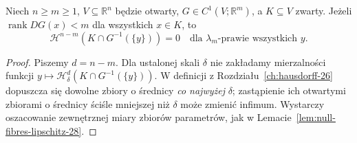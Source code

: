 \begin{lemat}
\label{lem:critical-coarea-null-28}
Niech $n\ge m\ge1$, $V\subseteq\mathbb R^n$
będzie otwarty, $G\in C^1(V;\mathbb R^m)$,
a $K\subseteq V$ zwarty. Jeżeli
$\operatorname{rank}DG(x)<m$ dla wszystkich $x\in K$,
to
\[
 \mathcal H^{n-m}(K\cap G^{-1}(\{y\}))=0
 \quad\text{dla }\lambda_m\text{-prawie wszystkich }y.
\]
\end{lemat}
\begin{proof}
Piszemy $d=n-m$. Dla ustalonej skali $\delta$ nie
zakładamy mierzalności funkcji
$y\mapsto\mathcal H^d_\delta(K\cap G^{-1}(\{y\}))$.
W definicji z Rozdziału~\ref{ch:hausdorff-26} dopuszcza
się dowolne zbiory o średnicy \emph{co najwyżej}
$\delta$; zastąpienie ich otwartymi zbiorami o średnicy
ściśle mniejszej niż $\delta$ może zmienić infimum.
Wystarczy oszacowanie zewnętrznej miary zbiorów
parametrów, jak w Lemacie~\ref{lem:null-fibres-lipschitz-28}.


\end{proof}
